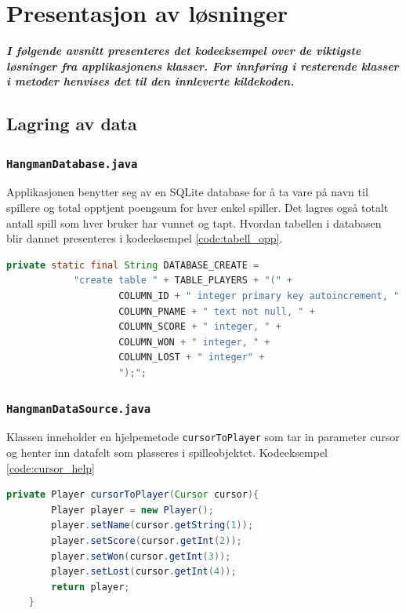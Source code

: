 \chapter{Presentasjon av løsninger}

\textbf{\emph{I følgende avsnitt presenteres det kodeeksempel over de viktigste løsninger fra applikasjonens klasser. For innføring i resterende klasser i metoder henvises det til den innleverte kildekoden.}}

\section{Lagring av data}

\subsection{\texttt{HangmanDatabase.java}}
Applikasjonen benytter seg av en SQLite database for å ta vare på navn til spillere og total opptjent poengsum for hver enkel spiller. Det lagres også totalt antall spill som hver bruker har vunnet og tapt. Hvordan tabellen i databasen blir dannet presenteres i kodeeksempel \ref{code:tabell_opp}.

\begin{lstlisting}[language=Java, caption=Script for opprettelse av tabell, label=code:tabell_opp]
 private static final String DATABASE_CREATE =
            "create table " + TABLE_PLAYERS + "(" +
                    COLUMN_ID + " integer primary key autoincrement, " +
                    COLUMN_PNAME + " text not null, " +
                    COLUMN_SCORE + " integer, " +
                    COLUMN_WON + " integer, " +
                    COLUMN_LOST + " integer" +
                    ");";
\end{lstlisting}


\subsection{\texttt{HangmanDataSource.java}}
Klassen inneholder en hjelpemetode \texttt{cursorToPlayer} som tar in parameter cursor og henter inn datafelt som plasseres i spilleobjektet. Kodeeksempel \ref{code:cursor_help}

\begin{lstlisting}[language=Java, caption=Hjelpemetode for plasering av cursor, label=code:cursor_help]
private Player cursorToPlayer(Cursor cursor){
        Player player = new Player();
        player.setName(cursor.getString(1));
        player.setScore(cursor.getInt(2));
        player.setWon(cursor.getInt(3));
        player.setLost(cursor.getInt(4));
        return player;
    }
\end{lstlisting}

